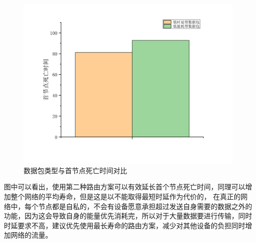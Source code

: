 \documentclass[a4paper,AutoFakeBold,oneside,12pt]{book}
\begin{document}
  \begin{figure}[htbp]
\centering %
\includegraphics[scale=0.3]{pictures/datatype-die.png} 
\caption{数据包类型与首节点死亡时间对比 } %
\label{datatype-die}
\end{figure}
  图中可以看出，使用第二种路由方案可以有效延长首个节点死亡时间，同理可以增加整个网络的平均寿命，但是这是以不能取得最短时延作为代价的，
  在真正的网络中，每个节点都是自私的，不会有设备愿意承担超过发送自身需要的数据之外的功能，因为这会导致自身的能量优先消耗完，所以对于大量数据要进行传输，同时时延要求不高，建议优先使用最长寿命的路由方案，减少对其他设备的负担同时增加网络的流量。
\end{document}
